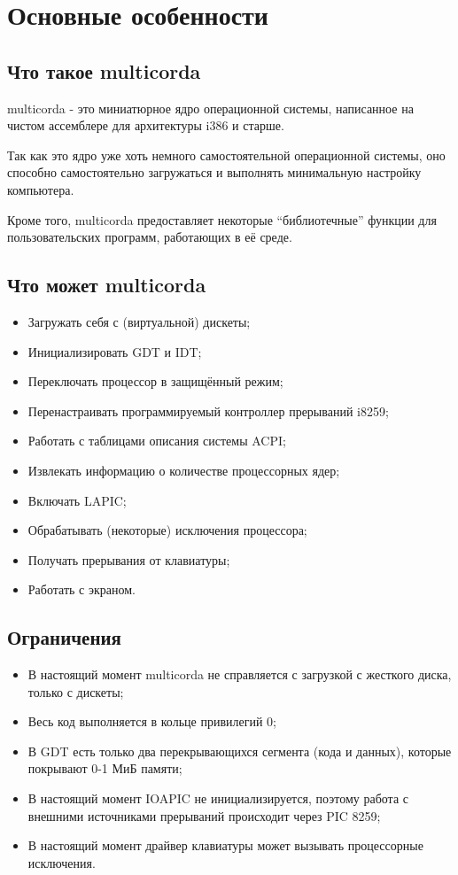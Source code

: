 \chapter{Основные особенности}

\section{Что такое multicorda}

multicorda - это миниатюрное ядро операционной системы, написанное на чистом ассемблере для архитектуры i386 и старше.

Так как это ядро уже хоть немного самостоятельной операционной системы, оно способно самостоятельно загружаться и выполнять минимальную настройку компьютера.

Кроме того, multicorda предоставляет некоторые ``библиотечные'' функции для пользовательских программ, работающих в её среде.

\section{Что может multicorda}
\begin{itemize}
\item Загружать себя с (виртуальной) дискеты;
\item Инициализировать GDT и IDT;
\item Переключать процессор в защищённый режим;
\item Перенастраивать программируемый контроллер прерываний i8259;
\item Работать с таблицами описания системы ACPI;
\item Извлекать информацию о количестве процессорных ядер;
\item Включать LAPIC;
\item Обрабатывать (некоторые) исключения процессора;
\item Получать прерывания от клавиатуры;
\item Работать с экраном.
\end{itemize}

\section{Ограничения}
\begin{itemize}
\item В настоящий момент multicorda не справляется с загрузкой с жесткого диска, только с дискеты;
\item Весь код выполняется в кольце привилегий 0;
\item В GDT есть только два перекрывающихся сегмента (кода и данных), которые покрывают 0-1 МиБ памяти;
\item В настоящий момент IOAPIC не инициализируется, поэтому работа с внешними источниками прерываний происходит через PIC 8259;
\item В настоящий момент драйвер клавиатуры может вызывать процессорные исключения.
\end{itemize}